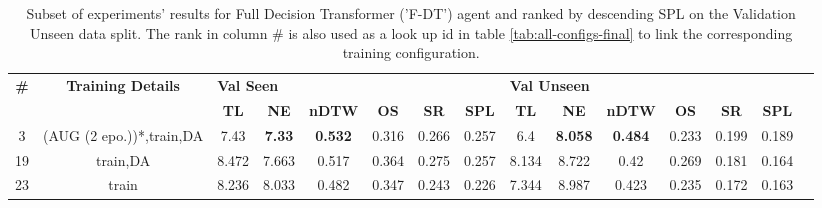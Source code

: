 \begin{table}
\centering
\caption{\label{tab:f_dt_final}Subset of experiments' results for Full Decision Transformer ('F-DT') agent and ranked by descending SPL on the Validation Unseen data split. The rank in column \# is also used as a look up id in table \ref{tab:all-configs-final} to link the corresponding training configuration.}
\begin{tabular}{@{\hskip3pt}c@{\hskip3pt}c@{\hskip3pt}c@{\hskip3pt}c@{\hskip3pt}c@{\hskip3pt}c@{\hskip3pt}c@{\hskip3pt}c@{\hskip3pt}c@{\hskip3pt}c@{\hskip3pt}c@{\hskip3pt}c@{\hskip3pt}c@{\hskip3pt}c@{\hskip3pt}c}
\toprule
\textbf{\#} & \textbf{Training Details} & \multicolumn{6}{l}{\textbf{Val Seen}} & \multicolumn{6}{l}{\textbf{Val Unseen}} \\
 \textbf{~} &                \textbf{~} &       \textbf{TL} &    \textbf{NE} &   \textbf{nDTW} & \textbf{OS} & \textbf{SR} & \textbf{SPL} &         \textbf{TL} &     \textbf{NE} &   \textbf{nDTW} & \textbf{OS} & \textbf{SR} & \textbf{SPL} \\
\midrule
          3 &  (AUG (2 epo.))*,train,DA &              7.43 &  \textbf{7.33} &  \textbf{0.532} &       0.316 &       0.266 &        0.257 &                 6.4 &  \textbf{8.058} &  \textbf{0.484} &       0.233 &       0.199 &        0.189 \\
         19 &                  train,DA &             8.472 &          7.663 &           0.517 &       0.364 &       0.275 &        0.257 &               8.134 &           8.722 &            0.42 &       0.269 &       0.181 &        0.164 \\
         23 &                     train &             8.236 &          8.033 &           0.482 &       0.347 &       0.243 &        0.226 &               7.344 &           8.987 &           0.423 &       0.235 &       0.172 &        0.163 \\
\bottomrule
\end{tabular}
\end{table}
